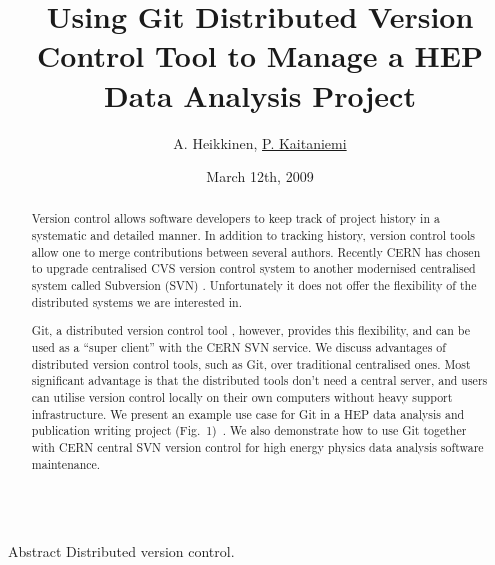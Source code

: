 \documentclass[final,hyperref={pdfpagelabels=false},notitlepage=true]{beamer}
\title[]{\Huge Using Git Distributed Version Control Tool to Manage a HEP Data Analysis Project}
\author{A. Heikkinen\inst{1}, \underline{P. Kaitaniemi\inst{1,2}}}
\institute[] %
{
  \inst{1}%
  Helsinki Institute of Physics P.O.Box 64 (Gustaf H\"allstr\"omin katu 2), FIN-00014 University of Helsinki, Finland
  \\
  \inst{2}%
  CEN-Saclay, CEA-IRFU/SPhN, 91 191 Gif sur Yvette, France
}
\date[March 12th, 2009]{March 12th, 2009}
\begin{document}
  \begin{frame}{} 
    \begin{center}
    \maketitle
    \end{center}
    \vfill
    \begin{abstract}
Version control allows software developers to keep track of project history in
a systematic and detailed manner. 
In addition to tracking history, version control tools allow
one to merge contributions between several authors.
Recently CERN has chosen to upgrade centralised CVS version control
system \cite{cernsvn} to another modernised centralised system called Subversion (SVN) \cite{svnsite}.
Unfortunately it does not offer the flexibility of the
distributed systems we are interested in. 

Git, a distributed version control tool \cite{torvalds}, however, 
provides this flexibility, 
and can be used as a ``super client'' with the CERN SVN service.
We discuss advantages of distributed version control tools,
such as Git, over traditional centralised ones. 
Most significant advantage is that the distributed
tools don't need a central server, and users can utilise
version control locally on their own computers without
heavy support infrastructure.
We present an example use case for Git in a HEP data analysis and publication writing project (Fig.~1)~\cite{pk09aProceedings}.
We also demonstrate how to use Git
together with CERN central SVN version control for high energy physics data
analysis software maintenance.

    \end{abstract}
    \begin{columns}[t]
      \begin{column}{0.45\linewidth}

    \begin{block}{\large Abstract}
      Distributed version control.
    \end{block}


\end{column}
\end{columns}
\end{frame}
\end{document}
